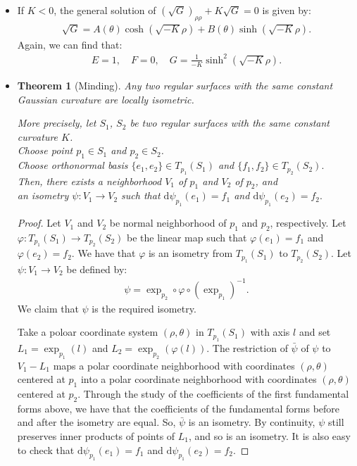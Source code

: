 \documentclass[10pt]{article}
\newtheorem{theorem}[lemma]{Theorem}
\newcommand{\dee}{\mathrm{d}}
\newcommand{\ra}{\rightarrow}
\begin{document}
\begin{itemize}
    \item If $K < 0$, the general solution of $(\sqrt{G})_{\rho\rho} + K \sqrt{G} = 0$ is given by:
    \begin{align*}
      \sqrt{G} = A(\theta) \cosh(\sqrt{-K}\rho) + B(\theta) \sinh(\sqrt{-K}\rho).
    \end{align*}
    Again, we can find that:
    \begin{align*}
      E = 1, \quad F = 0, \quad G = \frac{1}{-K} \sinh^2 (\sqrt{-K}\rho).
    \end{align*}

    \item \begin{theorem}[Minding]
      Any two regular surfaces with the same constant Gaussian curvature are locally isometric.

      More precisely, let $S_1$, $S_2$ be two regular surfaces with the same constant curvature $K$.\\
      Choose point $p_1 \in S_1$ and $p_2 \in S_2$.\\
      Choose orthonormal basis $\{e_1, e_2\} \in T_{p_1}(S_1)$ and $\{ f_1, f_2 \} \in T_{p_2}(S_2).$\\
      Then, there exists a neighborhood $V_1$ of $p_1$ and $V_2$ of $p_2$, and\\
      an isometry $\psi: V_1 \ra V_2$ such that $\dee\psi_{p_1}(
      e_1) = f_1$ and $\dee \psi_{p_1}(e_2) = f_2.$
    \end{theorem}

    \begin{proof}
      Let $V_1$ and $V_2$ be normal neighborhood of $p_1$ and $p_2$, respectively. Let $\varphi : T_{p_1}(S_1) \ra T_{p_2}(S_2)$ be the linear map such that $\varphi(e_1) = f_1$ and $\varphi(e_2) = f_2$. We have that $\varphi$ is an isometry from $T_{p_1}(S_1)$ to $T_{p_2}(S_2)$. Let $\psi: V_1 \ra V_2$ be defined by:
      \begin{align*}
        \psi = \exp_{p_2} \circ \varphi \circ (\exp_{p_1})^{-1}.
      \end{align*}
      We claim that $\psi$ is the required isometry.

      Take a poloar coordinate system $(\rho, \theta)$ in $T_{p_1}(S_1)$ with axis $l$ and set $L_1 = \exp_{p_1}(l)$ and $L_2 = \exp_{p_2}(\varphi(l)).$ The restriction of $\bar \psi$ of $\psi$ to $V_1 - L_1$ maps a polar coordinate neighborhood with coordinates $(\rho, \theta)$ centered at $p_1$ into a polar coordinate neighborhood with coordinates $(\rho, \theta)$ centered at $p_2$. Through the study of the coefficients of the first fundamental forms above, we have that the coefficients of the fundamental forms before and after the isometry are equal. So, $\bar \psi$ is an isometry. By continuity, $\psi$ still preserves inner products of points of $L_1$, and so is an isometry. It is also easy to check that $\dee \psi_{p_1}(e_1) = f_1$ and $\dee \psi_{p_1}(e_2) = f_2$.
    \end{proof}


\end{itemize}
\end{document}
